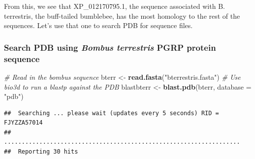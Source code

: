 \documentclass[]{article}
\newenvironment{Shaded}{\begin{snugshade}}{\end{snugshade}}
\newcommand{\KeywordTok}[1]{\textcolor[rgb]{0.13,0.29,0.53}{\textbf{#1}}}
\newcommand{\DataTypeTok}[1]{\textcolor[rgb]{0.13,0.29,0.53}{#1}}
\newcommand{\StringTok}[1]{\textcolor[rgb]{0.31,0.60,0.02}{#1}}
\newcommand{\CommentTok}[1]{\textcolor[rgb]{0.56,0.35,0.01}{\textit{#1}}}
\newcommand{\OperatorTok}[1]{\textcolor[rgb]{0.81,0.36,0.00}{\textbf{#1}}}
\newcommand{\NormalTok}[1]{#1}
\begin{document}
From this, we see that XP\_012170795.1, the sequence associated with B.
terrestris, the buff-tailed bumblebee, has the most homology to the rest
of the sequences. Let's use that one to search PDB for sequence files.

\subsubsection{\texorpdfstring{Search PDB using \emph{Bombus terrestris}
PGRP protein
sequence}{Search PDB using Bombus terrestris PGRP protein sequence}}\label{search-pdb-using-bombus-terrestris-pgrp-protein-sequence}

\begin{Shaded}
\begin{Highlighting}[]
\CommentTok{# Read in the bombus sequence}
\NormalTok{bterr <-}\StringTok{ }\KeywordTok{read.fasta}\NormalTok{(}\StringTok{"bterrestris.fasta"}\NormalTok{)}
\CommentTok{# Use bio3d to run a blastp against the PDB}
\NormalTok{blastbterr <-}\StringTok{ }\KeywordTok{blast.pdb}\NormalTok{(bterr, }\DataTypeTok{database =} \StringTok{"pdb"}\NormalTok{)}
\end{Highlighting}
\end{Shaded}

\begin{verbatim}
##  Searching ... please wait (updates every 5 seconds) RID = FJYZZA57014 
##  ...................................................................
##  Reporting 30 hits
\end{verbatim}

\begin{Shaded}
\end{Shaded}
\end{document}
